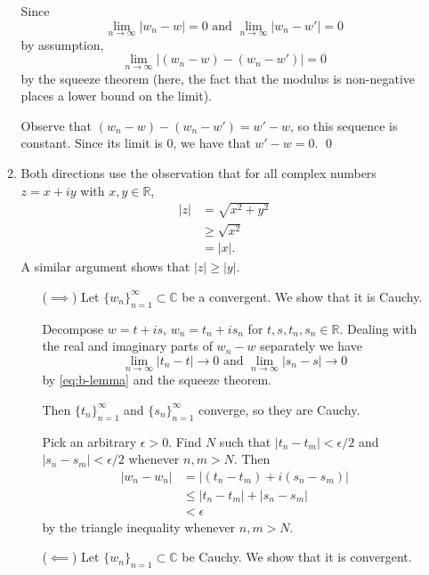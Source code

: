\documentclass[oneside]{article}
\newcommand\abs[1]{\left|#1\right|}
\newcommand\bbC{\mathbb{C}}
\newcommand\bbR{\mathbb{R}}
\begin{document}
\begin{enumerate}[label=\textbf{\arabic*.}]
\begin{enumerate}[label=\textbf{(\alph*)}]
      Since \[
        \lim_{n\to\infty}\abs{w_n - w} = 0
        \text{ and }\lim_{n\to\infty}\abs{w_n - w'} = 0
      \] by assumption,\[
        \lim_{n\to\infty}\abs{(w_n - w) - (w_n - w')} = 0
      \] by the squeeze theorem (here, the fact that the modulus is non-negative
      places a lower bound on the limit).

      Observe that $(w_n - w) - (w_n - w') = w' - w$, so this sequence is
      constant. Since its limit is $0$, we have that $w' - w = 0$. \qed

    \item Both directions use the observation that for all complex numbers
      $z = x + iy$ with $x, y \in \bbR$,
      \begin{align} \label{eq:b-lemma}
        \abs{z} &= \sqrt{x^2 + y^2} \nonumber\\
        &\geq \sqrt{x^2} \\
        &= \abs{x} \text{.} \nonumber
      \end{align} A similar argument shows that $\abs{z} \geq \abs{y}$.

      \begin{itemize}[leftmargin=34pt]
      \item[($\implies$)] Let $\{w_n\}_{n=1}^\infty \subset \bbC$ be a
        convergent. We show that it is Cauchy.

      Decompose $w = t + is$, $w_n = t_n + is_n$ for $t, s, t_n, s_n \in \bbR$.
      Dealing with the real and imaginary parts of $w_n - w$ separately we have
      \[
        \lim_{n\to\infty} \abs{t_n - t} \to 0
        \text{ and } \lim_{n\to\infty} \abs{s_n - s} \to 0
      \] by \eqref{eq:b-lemma} and the squeeze theorem.

      Then $\{t_n\}_{n=1}^\infty$ and $\{s_n\}_{n=1}^\infty$ converge, so they
      are Cauchy.

      Pick an arbitrary $\epsilon > 0$. Find $N$ such that
      $\abs{t_n - t_m} < \epsilon/2$ and $\abs{s_n - s_m} < \epsilon/2$
      whenever $n, m > N$. Then \begin{align*}
        \abs{w_n - w_n} &= \abs{(t_n - t_m) + i(s_n - s_m)} \\
        &\leq \abs{t_n - t_m} + \abs{s_n - s_m} \\
        &< \epsilon
      \end{align*} by the triangle inequality whenever $n, m > N$.

      \item[($\impliedby$)] Let $\{w_n\}_{n=1} \subset \bbC$ be Cauchy. We show
        that it is convergent.


\end{itemize}
\end{enumerate}
\end{enumerate}
\end{document}
